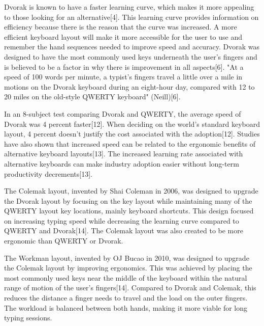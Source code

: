 \documentclass[manuscript,screen,review]{acmart}
\begin{document}
    Dvorak is known to have a faster learning curve, which makes it more appealing to those looking for an alternative[4]. This learning curve provides information on efficiency because there is the reason that the curve was increased. A more efficient keyboard layout will make it more accessible for the user to use and remember the hand sequences needed to improve speed and accuracy.  Dvorak was designed to have the most commonly used keys underneath the user's fingers and is believed to be a factor in why there is improvement in all aspects[6]. "At a speed of 100 words per minute, a typist's fingers travel a little over a mile in motions on the Dvorak keyboard during an eight-hour day, compared with 12 to 20 miles on the old-style QWERTY keyboard" (Neill)[6].  
    
    In an 8-subject test comparing Dvorak and QWERTY, the average speed of Dvorak was 4 percent faster[12].  When deciding on the world's standard keyboard layout, 4 percent doesn't justify the cost associated with the adoption[12].  Studies have also shown that increased speed can be related to the ergonomic benefits of alternative keyboard layouts[13].  The increased learning rate associated with alternative keyboards can make industry adoption easier without long-term productivity decrements[13].    

    The Colemak layout, invented by Shai Coleman in 2006, was designed to upgrade the Dvorak layout by focusing on the key layout while maintaining many of the QWERTY layout key locations, mainly keyboard shortcuts. This design focused on increasing typing speed while decreasing the learning curve compared to QWERTY and Dvorak[14]. The Colemak layout was also created to be more ergonomic than QWERTY or Dvorak. 
    
    The Workman layout, invented by OJ Bucao in 2010, was designed to upgrade the Colemak layout by improving ergonomics. This was achieved by placing the most commonly used keys near the middle of the keyboard within the natural range of motion of the user's fingers[14]. Compared to Dvorak and Colemak, this reduces the distance a finger needs to travel and the load on the outer fingers. The workload is balanced between both hands, making it more viable for long typing sessions.
\end{document}
